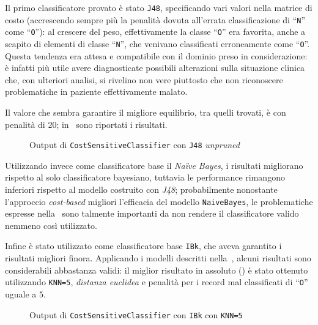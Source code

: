 Il primo classificatore provato è stato \texttt{J48}, specificando vari valori nella matrice di costo (accrescendo sempre più la penalità dovuta all'errata classificazione di ``\texttt{N}'' come ``\texttt{O}''):
al crescere del peso, effettivamente la classe ``\texttt{O}'' era favorita, anche a scapito di elementi di classe ``\texttt{N}'', che venivano classificati erroneamente come ``\texttt{O}''.
Questa tendenza era attesa e compatibile con il dominio preso in considerazione:
è infatti più utile avere diagnosticate possibili alterazioni sulla situazione clinica che, con ulteriori analisi, si rivelino non vere piuttosto che non riconoscere problematiche in paziente effettivamente malato.

Il valore che sembra garantire il migliore equilibrio, tra quelli trovati, è con penalità di \(20\);
in~ sono riportati i risultati.

\begin{figure}[H]
  \centering
  \caption{Output di \texttt{CostSensitiveClassifier} con \texttt{J48} \emph{unpruned}}%
  \label{fig:cost:j48}
\end{figure}

Utilizzando invece come classificatore base il \emph{Naïve Bayes}, i risultati migliorano rispetto al solo classificatore bayesiano, tuttavia le performance rimangono inferiori rispetto al modello costruito con \emph{J48};
probabilmente nonostante l'approccio \emph{cost-based} migliori l'efficacia del modello \texttt{NaiveBayes}, le problematiche espresse nella~ sono talmente importanti da non rendere il classificatore valido nemmeno così utilizzato.

Infine è stato utilizzato come classificatore base \texttt{IBk}, che aveva garantito i risultati migliori finora.
Applicando i modelli descritti nella~, alcuni risultati sono considerabili abbastanza validi:
il miglior risultato in assoluto () è stato ottenuto utilizzando \texttt{KNN=5}, \emph{distanza euclidea} e penalità per i record mal classificati di ``\texttt{O}'' uguale a \(5\).

\begin{figure}[H]
  \centering
  \caption{Output di \texttt{CostSensitiveClassifier} con \texttt{IBk} con \texttt{KNN=5}}%
  \label{fig:cost:ibk5}
\end{figure}

